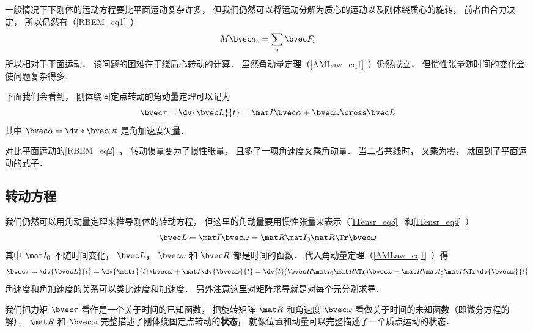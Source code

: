 

一般情况下下刚体的运动方程要比平面运动复杂许多， 但我们仍然可以将运动分解为质心的运动以及刚体绕质心的旋转， 前者由合力决定， 所以仍然有（\autoref{RBEM_eq1}~）
\begin{equation}\label{RBEqM_eq8}
M\bvec a_c = \sum_i \bvec F_i
\end{equation}
所以相对于平面运动， 该问题的困难在于绕质心转动的计算． 虽然角动量定理（\autoref{AMLaw_eq1}~）仍然成立， 但惯性张量随时间的变化会使问题复杂得多．

下面我们会看到， 刚体绕固定点转动的角动量定理可以记为
\begin{equation}
\bvec\tau = \dv{\bvec L}{t} = \mat I \bvec\alpha + \bvec\omega \cross \bvec L
\end{equation}
其中 $\bvec\alpha = \dv*{\bvec\omega}{t}$ 是角加速度矢量．

对比平面运动的\autoref{RBEM_eq2}~， 转动惯量变为了惯性张量， 且多了一项角速度叉乘角动量． 当二者共线时， 叉乘为零， 就回到了平面运动的式子．

\subsection{转动方程}
我们仍然可以用角动量定理来推导刚体的转动方程， 但这里的角动量要用惯性张量来表示（\autoref{ITensr_eq3}~ 和\autoref{ITensr_eq4}~）
\begin{equation}
\bvec L = \mat I \bvec \omega = \mat R \mat I_0 \mat R\Tr \bvec \omega
\end{equation}
其中 $\mat I_0$ 不随时间变化， $\bvec L$， $\bvec \omega$ 和 $\bvec R$ 都是时间的函数． 代入角动量定理（\autoref{AMLaw_eq1}~）得
\begin{equation}\label{RBEqM_eq3}
\bvec \tau = \dv{\bvec L}{t} = \dv{\mat I}{t} \bvec\omega + \mat I \dv{\bvec\omega}{t}
= \dv{t} (\bvec R\mat I_0 \mat R\Tr) \bvec \omega + \mat R \mat I_0 \mat R\Tr \dv{\bvec \omega}{t}
\end{equation}
角速度和角加速度的关系可以类比速度和加速度． 另外注意这里对矩阵求导就是对每个元分别求导．

我们把力矩 $\bvec \tau$ 看作是一个关于时间的已知函数， 把旋转矩阵 $\mat R$ 和角速度 $\bvec \omega$ 看做关于时间的未知函数（即微分方程的解）． $\mat R$ 和 $\bvec \omega$ 完整描述了刚体绕固定点转动的\textbf{状态}， 就像位置和动量可以完整描述了一个质点运动的状态．

